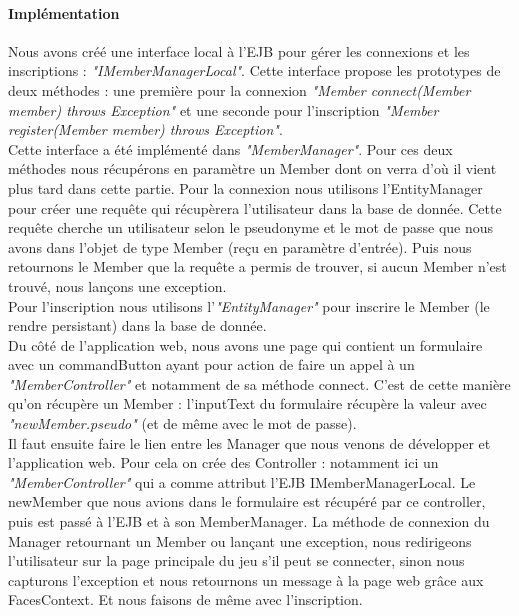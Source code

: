 \documentclass[a4paper,11pt]{report}
\begin{document}
      \paragraph{Implémentation}
        Nous avons créé une interface local à l'EJB pour gérer les connexions et les inscriptions : \textit{"IMemberManagerLocal"}. Cette interface propose les prototypes de deux méthodes : une première pour la connexion \textit{"Member connect(Member member) throws Exception"} et une seconde pour l'inscription \textit{"Member register(Member member) throws Exception"}.\\
        Cette interface a été implémenté dans \textit{"MemberManager"}. Pour ces deux méthodes nous récupérons en paramètre un Member dont on verra d'où il vient plus tard dans cette partie. Pour la connexion nous utilisons l'EntityManager pour créer une requête qui récupèrera l'utilisateur dans la base de donnée. Cette requête cherche un utilisateur selon le pseudonyme et le mot de passe que nous avons dans l'objet de type Member (reçu en paramètre d'entrée). Puis nous retournons le Member que la requête a permis de trouver, si aucun Member n'est trouvé, nous lançons une exception.\\
        Pour l'inscription nous utilisons l'\textit{"EntityManager"} pour inscrire le Member (le rendre persistant) dans la base de donnée.\\
        
        Du côté de l'application web, nous avons une page qui contient un formulaire avec un commandButton ayant pour action de faire un appel à un \textit{"MemberController"} et notamment de sa méthode connect. C'est de cette manière qu'on récupère un Member : l'inputText du formulaire récupère la valeur avec \textit{"newMember.pseudo"} (et de même avec le mot de passe).\\
        
        Il faut ensuite faire le lien entre les Manager que nous venons de développer et l'application web. Pour cela on crée des Controller : notamment ici un \textit{"MemberController"} qui a comme attribut l'EJB IMemberManagerLocal. Le newMember que nous avions dans le formulaire est récupéré par ce controller, puis est passé à l'EJB et à son MemberManager. La méthode de connexion du Manager retournant un Member ou lançant une exception, nous redirigeons l'utilisateur sur la page principale du jeu s'il peut se connecter, sinon nous capturons l'exception et nous retournons un message à la page web grâce aux FacesContext. Et nous faisons de même avec l'inscription.
      
\end{document}
